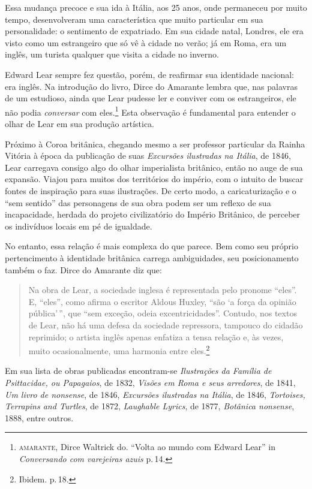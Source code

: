 \documentclass[11pt]{extarticle}
\begin{document}
Essa mudança precoce e sua ida à Itália, aos 25 anos,
onde permaneceu por muito tempo, desenvolveram uma característica
que muito particular em sua personalidade: o sentimento de 
expatriado. Em sua cidade natal, Londres, ele era visto como um 
estrangeiro que só vê à cidade no verão; já em Roma, era um inglês, 
um turista qualquer que visita a cidade no inverno. 

Edward Lear sempre fez questão, porém, de reafirmar sua identidade nacional:
era inglês. Na introdução do livro, Dirce do Amarante lembra que,
nas palavras de um estudioso, ainda que Lear pudesse ler e conviver com
os estrangeiros, ele não podia \textit{conversar} com eles.\footnote{\textsc{amarante}, 
Dirce Waltrick do. ``Volta ao mundo com Edward Lear'' in \textit{Conversando com varejeiras azuis} p.\,14.} 
Esta observação é fundamental para entender o olhar de Lear em sua 
produção artística. 

Próximo à Coroa britânica, chegando mesmo a ser professor particular
da Rainha Vitória à época da publicação de suas \textit{Excursões ilustradas na Itália}, de 1846,
Lear carregava consigo algo do olhar imperialista britânico, então no
auge de sua expansão. Viajou para muitos dos territórios do império,
com o intuito de buscar fontes de inspiração para suas ilustrações. 
De certo modo, a caricaturização e o ``sem sentido'' das personagens 
de sua obra podem ser um reflexo de sua incapacidade, herdada do projeto civilizatório 
do Império Britânico, de perceber os indivíduos locais em pé de igualdade. 

No entanto, essa relação é mais complexa do que parece. Bem como seu próprio 
pertencimento à identidade britânica carrega ambiguidades, seu posicionamento 
também o faz. Dirce do Amarante diz que:

\begin{quote}

Na obra de Lear, a sociedade inglesa é representada pelo pronome ``eles''. E, ``eles'', 
como afirma o escritor Aldous Huxley, ``são `a força da opinião pública'\,'', que ``sem exceção, 
odeia excentricidades''.
Contudo, nos textos de Lear, não há uma defesa da sociedade repressora, tampouco do cidadão 
reprimido; o artista inglês apenas enfatiza a tensa relação e, às vezes, muito ocasionalmente, 
uma harmonia entre eles.\footnote{Ibidem. p.\,18.}

\end{quote}

Em sua lista de obras publicadas encontram-se \textit{Ilustrações da Família de Psittacidae, ou Papagaios}, de 1832,
\textit{Visões em Roma e seus arredores}, de 1841, \textit{Um livro de \emph{nonsense}}, de 1846,
\textit{Excursões ilustradas na Itália}, de 1846, \textit{Tortoises, Terrapins and Turtles}, de 1872,
\textit{Laughable Lyrics}, de 1877, \textit{Botânica \emph{nonsense}}, 1888, entre outros.
\end{document}
